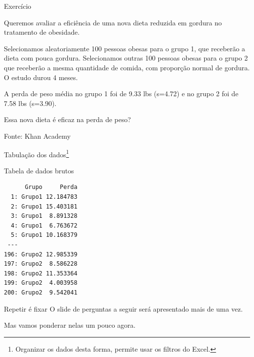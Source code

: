 \documentclass{beamer}
\begin{document}
\begin{frame}{\scriptsize Exercício}
  \begin{exampleblock}{}
    \footnotesize
    Queremos avaliar a eficiência de uma nova dieta reduzida em
    gordura no tratamento de obesidade.

    \bigskip
    {\footnotesize
      Selecionamos aleatoriamente 100 pessoas obesas para o grupo 1, que receberão a dieta com pouca gordura.
      Selecionamos outras 100 pessoas obesas para o grupo 2 que receberão a mesma quantidade de comida, com proporção normal de gordura.
      O estudo durou 4 meses.
    }

    \bigskip
    \begin{exampleblock}{}
      \footnotesize
      A perda de peso média no grupo 1 foi de 9.33 lbs
      (s=4.72) e no grupo 2 foi de 7.58 lbs (s=3.90).
    \end{exampleblock}
  \end{exampleblock}
  \begin{block}{}
    Essa nova dieta é eficaz na perda de peso?
  \end{block}
  \hfill {\footnotesize Fonte: Khan Academy}
\end{frame}

\begin{frame}[fragile]{\scriptsize Tabulação dos dados\footnote{\tiny Organizar os dados desta forma, permite usar os filtros do Excel.}}
  \begin{block}{Tabela de dados brutos}
    \tiny
\begin{verbatim}
      Grupo     Perda
  1: Grupo1 12.184783
  2: Grupo1 15.403181
  3: Grupo1  8.891328
  4: Grupo1  6.763672
  5: Grupo1 10.168379
 ---                 
196: Grupo2 12.985339
197: Grupo2  8.586228
198: Grupo2 11.353364
199: Grupo2  4.003958
200: Grupo2  9.542041
\end{verbatim}
  \end{block}
\end{frame}

\begin{frame}{\scriptsize }
  \begin{block}{Repetir é fixar}
    {\small
    O slide de perguntas a seguir será apresentado mais de uma vez.}

    \begin{center}
      Mas vamos ponderar nelas um pouco agora.
    \end{center}
  \end{block}
\end{frame}
\end{document}
